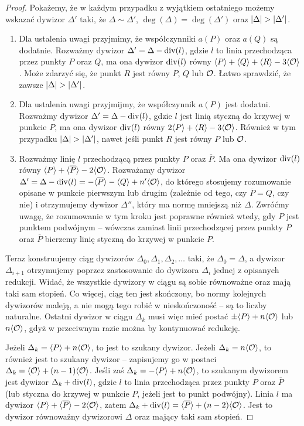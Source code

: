 \begin{proof}
Pokażemy, że w każdym przypadku z wyjątkiem ostatniego
możemy wskazać dywizor $\Delta'$ taki,
że $\Delta \sim \Delta'$, $\deg(\Delta) = \deg(\Delta')$
oraz $\lvert\Delta\rvert > \lvert\Delta'\rvert$.
\begin{enumerate}
\item Dla ustalenia uwagi przyjmimy,
że współczynniki $a(P)$ oraz $a(Q)$ są dodatnie.
Rozważmy dywizor $\Delta' = \Delta - \operatorname{div}(l)$,
gdzie $l$ to linia przechodząca przez punkty $P$ oraz $Q$,
ma ona dywizor $\operatorname{div}(l)$ równy
$\langle P\rangle + \langle Q\rangle + \langle R\rangle - 3\langle\mathcal{O}\rangle$.
Może zdarzyć się, że punkt $R$ jest równy $P$, $Q$ lub $\mathcal{O}$.
Łatwo sprawdzić, że zawsze $\lvert\Delta\rvert > \lvert\Delta'\rvert$.
\item Dla ustalenia uwagi przyjmijmy, że współczynnik $a(P)$ jest dodatni.
Rozważmy dywizor $\Delta' = \Delta - \operatorname{div}(l)$,
gdzie $l$ jest linią styczną do krzywej w punkcie $P$,
ma ona dywizor $\operatorname{div}(l)$ równy $2\langle P\rangle + \langle R\rangle - 3\langle\mathcal{O}\rangle$.
Również w tym przypadku $\lvert\Delta\rvert > \lvert\Delta'\rvert$,
nawet jeśli punkt $R$ jest równy $P$ lub $\mathcal{O}$.
\item Rozważmy linię $l$ przechodzącą przez punkty $P$ oraz $\overline{P}$.
Ma ona dywizor $\operatorname{div}(l)$ równy
$\langle P\rangle + \langle\overline{P}\rangle - 2\langle\mathcal{O}\rangle$.
Rozważamy dywizor
$\Delta' =
\Delta - \operatorname{div}(l) =
-\langle\overline{P}\rangle - \langle Q\rangle + n'\langle\mathcal{O}\rangle$,
do którego stosujemy rozumowanie opisane w punkcie pierwszym lub drugim
(zależnie od tego, czy $\overline{P} = Q$, czy nie)
i otrzymujemy dywizor $\Delta''$, który ma normę mniejszą niż $\Delta$.
Zwróćmy uwagę, że rozumowanie w tym kroku jest poprawne również wtedy,
gdy $P$ jest punktem podwójnym --
wówczas zamiast linii przechodzącej przez punkty $P$ oraz $\overline{P}$
bierzemy linię styczną do krzywej w punkcie $P$.
\end{enumerate}

Teraz konstruujemy ciąg dywizorów
$\Delta_0, \Delta_1, \Delta_2, \ldots$ taki,
że $\Delta_0 = \Delta$,
a dywizor $\Delta_{i+1}$ otrzymujemy
poprzez zastosowanie do dywizora $\Delta_i$ jednej z opisanych redukcji.
Widać, że wszystkie dywizory w ciągu są sobie równoważne
oraz mają taki sam stopień.
Co więcej, ciąg ten jest skończony,
bo normy kolejnych dywizorów maleją,
a nie mogą tego robić w nieskończoność -- są to liczby naturalne.
Ostatni dywizor w ciągu $\Delta_k$ musi więc mieć postać
$\pm\langle P\rangle + n\langle\mathcal{O}\rangle$ lub $n\langle\mathcal{O}\rangle$,
gdyż w przeciwnym razie można by kontynuować redukcję.

Jeżeli $\Delta_k = \langle P\rangle + n\langle\mathcal{O}\rangle$,
to jest to szukany dywizor.
Jeżeli $\Delta_k = n\langle\mathcal{O}\rangle$,
to również jest to szukany dywizor --
zapisujemy go w postaci $\Delta_k = \langle\mathcal{O}\rangle + (n-1)\langle\mathcal{O}\rangle$.
Jeśli zaś $\Delta_k = -\langle P\rangle + n\langle\mathcal{O}\rangle$,
to szukanym dywizorem jest dywizor
$\Delta_k + \operatorname{div}(l)$,
gdzie $l$ to linia przechodząca przez punkty $P$ oraz $\overline{P}$
(lub styczna do krzywej w punkcie $P$, jeżeli jest to punkt podwójny).
Linia $l$ ma dywizor $\langle P\rangle + \langle\overline{P}\rangle - 2\langle\mathcal{O}\rangle$,
zatem $\Delta_k + \operatorname{div}(l) = \langle\overline{P}\rangle + (n-2)\langle\mathcal{O}\rangle$.
Jest to dywizor równoważny dywizorowi $\Delta$ oraz mający taki sam stopień.
\end{proof}

